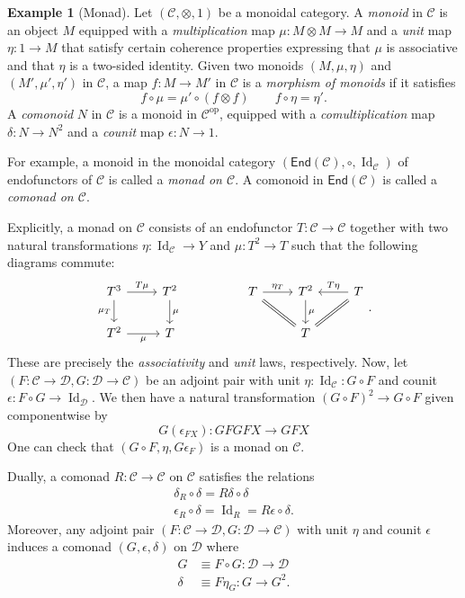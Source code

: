 \documentclass[10pt,letterpaper,cm]{nupset}
\theoremstyle{definition}
\newtheorem{exmp}[definition]{Example}
\theoremstyle{theorem}
\theoremstyle{remark}
\newcommand{\1}{\mathbf{1}}
\renewcommand{\c}{\mathscr{C}}
\renewcommand{\d}{\mathscr{D}}
\newcommand{\0}{\vec 0}
\DeclareMathOperator{\id}{Id}
\DeclareMathOperator{\op}{op}
\begin{document}
\begin{exmp}[Monad]
Let $\left(\c, \otimes, 1\right)$ be a monoidal category. A \textit{monoid} in $\c$ is an object $M$ equipped with a \textit{multiplication} map $\mu : M \otimes M \to M$ and a \textit{unit} map $\eta : 1 \to M$ that satisfy certain coherence properties expressing that $\mu$ is associative and that $\eta$ is a two-sided identity. Given two monoids $\left(M, \mu, \eta\right)$ and $\left(M', \mu', \eta'\right)$ in $\c$, a map $f : M \to M'$ in $\c$ is a \textit{morphism of monoids} if it satisfies 
\[
f \circ \mu = \mu' \circ \left(f \otimes f\right) \quad \quad f \circ \eta = \eta'.
\]
A \textit{comonoid} $N$ in $\c$ is a monoid in $\c^{\op}$,  equipped with a \textit{comultiplication} map $\delta :  N\to N^2$ and a \textit{counit} map $\epsilon :N\to 1$. 

For example, a monoid  in the monoidal category $\left(\mathsf{End}(\c), \circ, \id_{\c}\right)$ of endofunctors of $\c$ is called a \textit{monad on $\c$}. A comonoid in $\mathsf{End}(\c)$ is called a \textit{comonad on $\c$}.

Explicitly, a monad on $\c$ consists of an endofunctor $T: \c \to \c$ together with two natural transformations $\eta :\id_{\c} \to Y$ and $\mu : T^2 \to T$ such that the following diagrams commute:
\[
\begin{tikzcd}
T^3 \arrow[d, "\mu_T"'] \arrow[r, "T{\mu}"] & T^2 \arrow[d, "\mu"] &  & T \arrow[rd, equal] \arrow[r, "\eta_T"] & T^2 \arrow[d, "\mu"] & T \arrow[ld, equal] \arrow[l, "T{\eta}"'] \\
T^2 \arrow[r, "\mu"']                       & T                    &  &                                  & T                    &                                   
\end{tikzcd}
.\] These are precisely the \textit{associativity} and \textit{unit} laws, respectively. Now, let $\left(F: \c \to \d, G: \d \to \c \right)$ be an adjoint pair with unit $\eta :\id_{\c} :G\circ F$ and counit $\epsilon : F\circ G \to \id_{\d}$.  We then  have a natural transformation $\left(G\circ F\right)^2 \to G\circ F$ given componentwise by
\[
G\left(\epsilon_{F{X}}\right) : G{F{G{F{X}}}}  \to G{F{X}}
\] One can check that $\left(G \circ F, \eta, G{\epsilon_F}\right)$ is a monad on $\c$.

Dually, a comonad $R :\c \to \c$ on $\c$ satisfies the relations
\begin{gather*}
\delta_{R} \circ \delta=R \delta \circ \delta\\
\epsilon_{R} \circ \delta= \id_{R}=R \epsilon \circ \delta.
\end{gather*}
Moreover, any adjoint pair $\left(F: \c \to \d, G: \d \to \c \right)$ with unit $\eta$ and counit $\epsilon$ induces a comonad $\left(G, \epsilon, \delta\right)$ on $\d$ where
\begin{align*}
G& \equiv F\circ G : \d \to \d
\\ \delta &\equiv F{\eta_G} : G \to G^2.
\end{align*}
\end{exmp}
\end{document}
